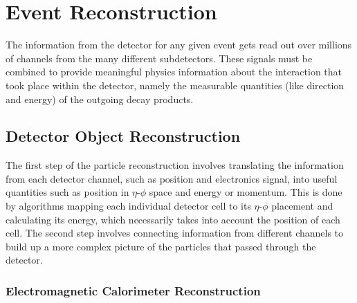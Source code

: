\chapter{Event Reconstruction}
\label{evReco}


The information from the detector for any given event 
gets read out over millions of channels 
from the many different subdetectors.  
These signals must be combined to provide 
meaningful physics information 
about the interaction that took place 
within the detector, 
namely the measurable quantities 
(like direction and energy) 
of the outgoing decay products.  

\section{Detector Object Reconstruction}
\label{evReco:detReco}

The first step of the particle reconstruction 
involves translating the information from each 
detector channel, 
such as position and electronics signal, 
into useful quantities such as position in 
$\eta$-$\phi$ space and energy or momentum.  
This is done by algorithms 
mapping each individual 
detector cell to its $\eta$-$\phi$ placement 
and calculating its energy, 
which necessarily takes into account 
the position of each cell.  
The second step involves 
connecting information from different channels 
to build up a more complex picture of 
the particles that passed through the detector.  

\subsection{Electromagnetic Calorimeter Reconstruction}
\label{evReco:ECAL}

